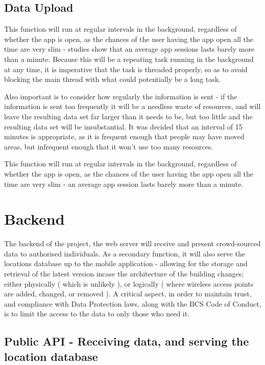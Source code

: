 \documentclass[11pt]{informatics-report}
\begin{document}
\subsection{Data Upload}

This function will run at regular intervals in the background, regardless of whether the app is open, as the chances of the user having the app open all the time are very slim - studies show that an average app sessions lasts barely more than a minute\cite{Bohmer:2011:FAA:2037373.2037383}. Because this will be a repeating task running in the background at any time, it is imperative that the task is threaded properly, so as to avoid blocking the main thread with what could potentially be a long task. 

Also important is to consider how regularly the information is sent - if the information is sent too frequently it will be a needless waste of resources, and will leave the resulting data set far larger than it needs to be, but too little and the resulting data set will be insubstantial. It was decided that an interval of 15 minutes is appropriate, as it is frequent enough that people may have moved areas, but infrequent enough that it won't use too many resources. 

This function will run at regular intervals in the background, regardless of whether the app is open, as the chances of the user having the app open all the time are very slim - an average app session lasts barely more than a minute\cite{Bohmer:2011:FAA:2037373.2037383}. 

\section{Backend}

The backend of the project, the web server will receive and present crowd-sourced data to authorised individuals. As a secondary function, it will also serve the locations database up to the mobile application - allowing for the storage and retrieval of the latest version incase the architecture of the building changes; either physically ( which is unlikely ), or logically ( where wireless access points are added, changed, or removed ). A critical aspect, in order to maintain trust, and compliance with Data Protection laws, along with the BCS Code of Conduct, is to limit the access to the data to only those who need it.


\subsection{Public API - Receiving data, and serving the location database}
\end{document}
